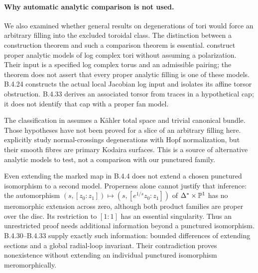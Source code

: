 \paragraph{Why automatic analytic comparison is not used.}
We also examined whether general results on degenerations of tori
would force an arbitrary filling into the excluded toroidal class.
The distinction between a construction theorem and such a comparison
theorem is essential. \citet[Theorem 5.1.3 and Sections 5.2--5.4]
{KKN2008Root} construct proper analytic models of log complex tori
without assuming a polarization. Their input is a specified log
complex torus and an admissible pairing; the theorem does not assert
that every proper analytic filling is one of these models.
B.4.24 constructs the actual local Jacobian log input and isolates
its affine torsor obstruction. B.4.33 derives an associated torsor
from traces in a hypothetical cap; it does not identify that cap
with a proper fan model.

The classification in \citet[Theorem 3.1]{KamenovaToriRoot} assumes
a K\"ahler total space and trivial canonical bundle. Those hypotheses
have not been proved for a slice of an arbitrary filling here.
\citet[Section 3, Proposition 3.1]{SchroeerSiebert2002Root} explicitly
study normal-crossings degenerations with Hopf normalization, but
their smooth fibres are primary Kodaira surfaces. This is a source
of alternative analytic models to test, not a comparison with our
punctured family.

Even extending the marked map in B.4.4 does not extend a chosen
punctured isomorphism to a second model. Properness alone cannot
justify that inference: the automorphism
$(s,[z_0:z_1])\mapsto(s,[e^{1/s}z_0:z_1])$ of
$\Delta^*\times\mathbb P^1$ has no meromorphic extension across zero,
although both product families are proper over the disc. Its
restriction to $[1:1]$ has an essential singularity. Thus an
unrestricted proof needs additional information beyond a
punctured isomorphism. B.4.30--B.4.33 supply exactly such information:
bounded differences of extending sections and a global radial-loop
invariant. Their contradiction proves nonexistence without extending
an individual punctured isomorphism meromorphically.
